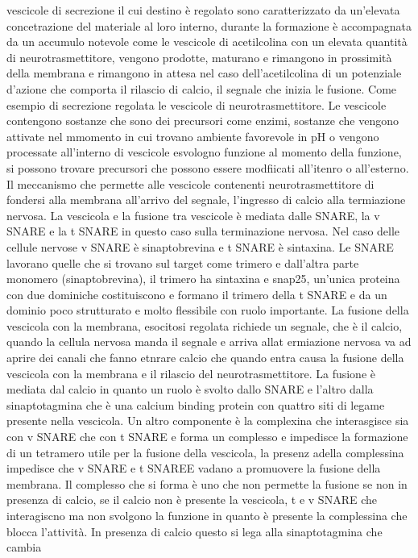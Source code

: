 vescicole di secrezione il cui destino \`e regolato sono caratterizzato da un'elevata concetrazione del materiale al loro interno, durante la formazione \`e accompagnata da un accumulo
notevole come le vescicole di acetilcolina con un elevata quantit\`a di neurotrasmettitore, vengono prodotte, maturano e rimangono in prossimit\`a della membrana e rimangono in attesa
nel caso dell'acetilcolina di un potenziale d'azione che comporta il rilascio di calcio, il segnale che inizia le fusione. Come esempio di secrezione regolata le vescicole di 
neurotrasmettitore. Le vescicole contengono sostanze che sono dei precursori come enzimi, sostanze che vengono attivate nel mmomento in cui trovano ambiente favorevole in pH o 
vengono processate all'interno di vescicole esvologno funzione al momento della funzione, si possono trovare precursori che possono essere modfiicati all'itenro o all'esterno. Il 
meccanismo che permette alle vescicole contenenti neurotrasmettitore di fondersi alla membrana all'arrivo del segnale, l'ingresso di calcio alla termiazione nervosa. La vescicola e la
fusione tra vescicole \`e mediata dalle SNARE, la v SNARE e la t SNARE in questo caso sulla terminazione nervosa. Nel caso delle cellule nervose v SNARE \`e sinaptobrevina e 
t SNARE \`e sintaxina. Le SNARE lavorano quelle che si trovano sul target come trimero e dall'altra parte monomero (sinaptobrevina), il trimero ha sintaxina e snap25, un'unica proteina
con due dominiche costituiscono e formano il trimero della t SNARE e da un dominio poco strutturato e molto flessibile con ruolo importante. La fusione della vescicola con la membrana,
esocitosi regolata richiede un segnale, che \`e il calcio, quando la cellula nervosa manda il segnale e arriva allat ermiazione nervosa va ad aprire dei canali che fanno etnrare calcio
che quando entra causa la fusione della vescicola con la membrana e il rilascio del neurotrasmettitore. La fusione \`e mediata dal calcio in quanto un ruolo \`e svolto dallo SNARE e 
l'altro dalla sinaptotagmina che \`e una calcium binding protein con quattro siti di legame presente nella vescicola. Un altro componente \`e la complexina che interasgisce sia con v 
SNARE che con t SNARE e forma un complesso e impedisce la formazione di un tetramero utile per la fusione della vescicola, la presenz adella complessina impedisce che v SNARE e t SNAREE
vadano a promuovere la fusione della membrana. Il complesso che si forma \`e uno che non permette la fusione se non in presenza di calcio, se il calcio non \`e presente la vescicola, 
t e v SNARE che interagiscno ma non svolgono la funzione in quanto \`e presente la complessina che blocca l'attivit\`a. In presenza di calcio questo si lega alla sinaptotagmina che cambia
